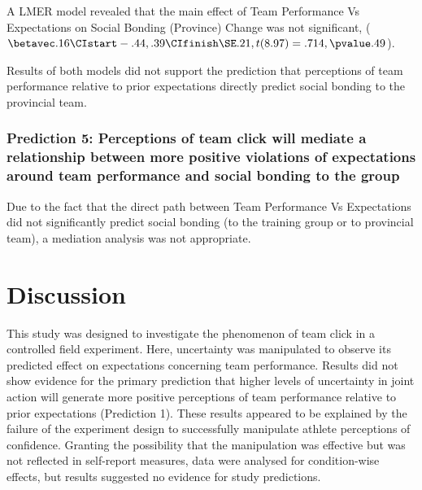 \begin{CJK}{UTF8}{gbsn}
 A LMER model revealed that the main effect of Team Performance Vs Expectations on Social Bonding (Province) Change was not significant, ($\betavec .16 \CIstart -.44, .39 \CIfinish \SE .21, t(8.97) = .714, \pvalue .49$).

Results of both models did not support the prediction that perceptions of team performance relative to prior expectations directly predict social bonding to the provincial team.



\subsubsection{Prediction 5: Perceptions of team click will mediate a relationship between more positive violations of expectations around team performance and social bonding to the group}

Due to the fact that the direct path between Team Performance Vs Expectations did not significantly predict social bonding (to the training group or to provincial team), a mediation analysis was not appropriate.




































\clearpage
\section{Discussion\label{sect:discussionTrain}}
This study was designed to investigate the phenomenon of team click in a controlled field experiment. Here, uncertainty was manipulated   to observe its predicted effect on expectations concerning team performance.  Results did not show evidence for the primary prediction that higher levels of uncertainty in joint action will generate more positive perceptions of team performance relative to prior expectations (Prediction 1).  These results appeared to be explained by the failure of the experiment design to successfully manipulate athlete perceptions of confidence.  Granting the possibility that the manipulation was effective but was not reflected in self-report measures, data were analysed for condition-wise effects, but results suggested no evidence for study predictions.


\end{CJK}
